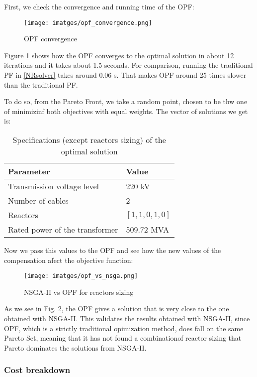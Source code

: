 \documentclass[a4paper,11pt, titlepage, twoside]{article}
\begin{document}
First, we check the convergence and running time of the OPF:
\begin{figure}[H]
    \centering
    \texttt{[image: imatges/opf\_convergence.png]}
    \caption{OPF convergence}
    \label{fig:opfconv}   
\end{figure}
Figure \ref{fig:opfconv} shows how the OPF converges to the optimal solution in about 12 iterations and it takes about 1.5 seconds. For comparison, running the traditional PF in \ref{NRsolver} takes around 0.06 s.
That makes OPF around 25 times slower than the traditional PF.

To do so, from the Pareto Front, we take a random point, chosen to be thw one of minimizinf both objectives with equal weights. The vector of solutions we get is:
\begin{table}[H]
    \centering
    \begin{tabular}{l l}
    \hline
    \textbf{Parameter} & \textbf{Value} \\
    \hline
    Transmission voltage level & 220 kV \\
    Number of cables & 2 \\
    Reactors & $[1, 1, 0, 1, 0]$ \\
    Rated power of the transformer & 509.72 MVA \\
    \hline
    \end{tabular}
    \caption{Specifications (except reactors sizing) of the optimal solution}
    \label{table:optimalvaluesdicrete}
    \end{table}

Now we pass this values to the OPF and see how the new values of the compensation afect the objective function:
\begin{figure}[H]
    \centering
    \texttt{[image: imatges/opf\_vs\_nsga.png]}
    \caption{NSGA-II vs OPF for reactors sizing}
    \label{fig:opfvsnsga}   
\end{figure}
As we see in Fig. \ref{fig:opfvsnsga}, the OPF gives a solution that is very close to the one obtained with NSGA-II. This validates the results obtained with NSGA-II, since OPF, which is a strictly traditional opimization method, does fall on the same Pareto Set, meaning that it has not found a combinationof reactor sizing that Pareto 
dominates the solutions from NSGA-II.

\subsubsection{Cost breakdown}
\end{document}
